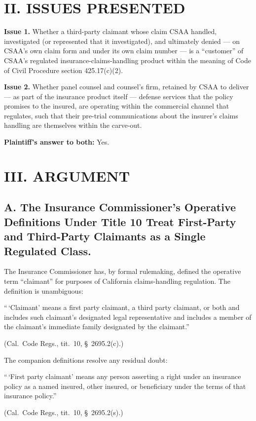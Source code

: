 \section*{II. ISSUES PRESENTED}

\textbf{Issue 1.} Whether a third-party claimant whose claim CSAA handled, investigated (or represented that it investigated), and ultimately denied --- on CSAA's own claim form and under its own claim number --- is a ``customer'' of CSAA's regulated insurance-claims-handling product within the meaning of Code of Civil Procedure section 425.17(c)(2).

\textbf{Issue 2.} Whether panel counsel and counsel's firm, retained by CSAA to deliver --- as part of the insurance product itself --- defense services that the policy promises to the insured, are operating within the commercial channel that  regulates, such that their pre-trial communications about the insurer's claims handling are themselves within the carve-out.

\textbf{Plaintiff's answer to both:} Yes.

\section*{III. ARGUMENT}

\subsection*{A. The Insurance Commissioner's Operative Definitions Under Title 10 Treat First-Party and Third-Party Claimants as a Single Regulated Class.}

The Insurance Commissioner has, by formal rulemaking, defined the operative term ``claimant'' for purposes of California claims-handling regulation. The definition is unambiguous:

\begin{quoting}
``\,`Claimant' means a first party claimant, a third party claimant, or both and includes such claimant's designated legal representative and includes a member of the claimant's immediate family designated by the claimant.''
\end{quoting}
\begin{flushright}
\small (Cal.\ Code Regs., tit.\ 10, \S~2695.2(c).)
\end{flushright}

\noindent The companion definitions resolve any residual doubt:

\begin{quoting}
``\,`First party claimant' means any person asserting a right under an insurance policy as a named insured, other insured, or beneficiary under the terms of that insurance policy.''
\end{quoting}
\begin{flushright}
\small (Cal.\ Code Regs., tit.\ 10, \S~2695.2(s).)
\end{flushright}

